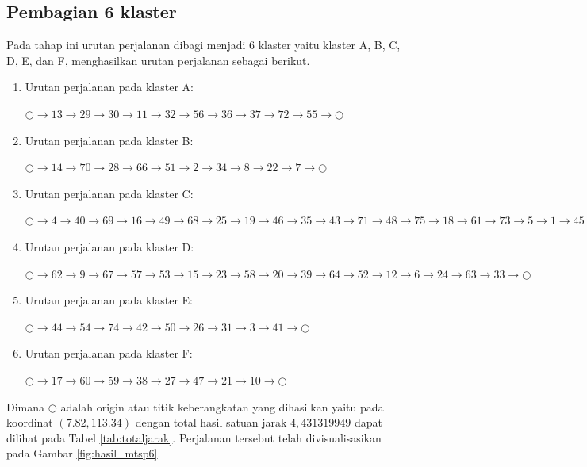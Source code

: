 \subsection{Pembagian 6 klaster}

Pada tahap ini urutan perjalanan dibagi menjadi 6 klaster yaitu klaster A, B, C, D, E, dan F, menghasilkan urutan perjalanan sebagai berikut.

\begin{enumerate}

\item Urutan perjalanan pada klaster A:

$\bigcirc \to 13 \to 29 \to 30 \to 11 \to 32 \to 56 \to 36 \to 37 \to 72 \to 55 \to \bigcirc$

\item Urutan perjalanan pada klaster B:

$\bigcirc \to 14 \to 70 \to 28 \to 66 \to 51 \to 2 \to 34 \to 8 \to 22 \to 7 \to \bigcirc$

\item Urutan perjalanan pada klaster C:

$\bigcirc \to 4 \to 40 \to 69 \to 16 \to 49 \to 68 \to 25 \to 19 \to 46 \to 35 \to 43 \to 71 \to 48 \to 75 \to 18 \to 61 \to 73 \to 5 \to 1 \to 45 \to 65 \to \bigcirc$

\item Urutan perjalanan pada klaster D:

$\bigcirc \to 62 \to 9 \to 67 \to 57 \to 53 \to 15 \to 23 \to 58 \to 20 \to 39 \to 64 \to 52 \to 12 \to 6 \to 24 \to 63 \to 33 \to \bigcirc$

\item Urutan perjalanan pada klaster E:

$\bigcirc \to 44 \to 54 \to 74 \to 42 \to 50 \to 26 \to 31 \to 3 \to 41 \to \bigcirc$

\item Urutan perjalanan pada klaster F:

$\bigcirc \to 17 \to 60 \to 59 \to 38 \to 27 \to 47 \to 21 \to 10 \to \bigcirc$

\end{enumerate}

Dimana $\bigcirc$ adalah origin atau titik keberangkatan yang dihasilkan yaitu pada koordinat $(7.82, 113.34)$ dengan total hasil satuan jarak $4,431319949$ dapat dilihat pada Tabel \ref{tab:totaljarak}. Perjalanan tersebut telah divisualisasikan pada Gambar \ref{fig:hasil_mtsp6}.

